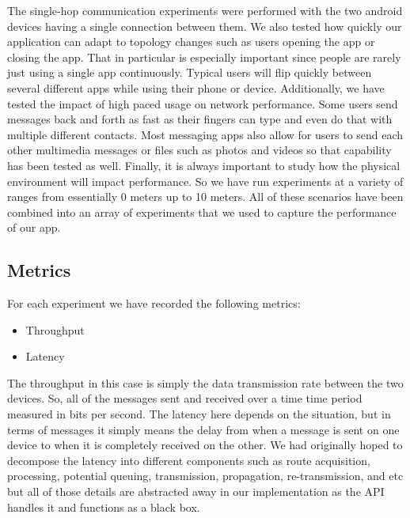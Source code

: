 \documentclass[10pt]{article}
\begin{document}
The single-hop communication experiments were performed with the two android devices having a single connection between them. We also tested how quickly our application can adapt to topology changes such as users opening the app or closing the app. That in particular is especially important since people are rarely just using a single app continuously. Typical users will flip quickly between several different apps while using their phone or device. Additionally, we have tested the impact of high paced usage on network performance. Some users send messages back and forth as fast as their fingers can type and even do that with multiple different contacts. Most messaging apps also allow for users to send each other multimedia messages or files such as photos and videos so that capability has been tested as well. Finally, it is always important to study how the physical environment will impact performance. So we have run experiments at a variety of ranges from essentially 0 meters up to 10 meters. All of these scenarios have been combined into an array of experiments that we used to capture the performance of our app.

\subsection{Metrics}

For each experiment we have recorded the following metrics:

\begin{itemize}
    \item Throughput
    \item Latency
\end{itemize}

The throughput in this case is simply the data transmission rate between the two devices. So, all of the messages sent and received over a time time period measured in bits per second. The latency here depends on the situation, but in terms of messages it simply means the delay from when a message is sent on one device to when it is completely received on the other. We had originally hoped to decompose the latency into different components such as route acquisition, processing, potential queuing, transmission, propagation, re-transmission, and etc but all of those details are abstracted away in our implementation as the API handles it and functions as a black box.
\end{document}

